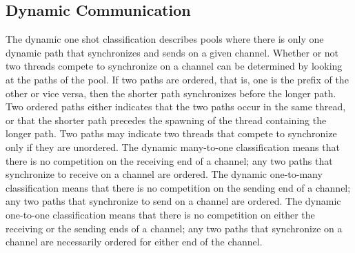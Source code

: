 \documentclass[letterpaper, 11pt]{extarticle}
\begin{document}
\subsection{Dynamic Communication}

The dynamic one shot classification describes pools where there is only one dynamic path
that synchronizes and sends on a given channel. Whether or not two threads compete to
synchronize on a channel can be determined by
looking at the paths of the pool. If two paths are ordered, that is, one is the
prefix of the other or vice versa, then the shorter path synchronizes before the longer path.
Two ordered paths either indicates that the two paths occur in the same thread, or
that the shorter path precedes the spawning of the thread containing the longer path.
Two paths may indicate two threads that compete to synchronize only if they are unordered.
The dynamic many-to-one classification means that
there is no competition on the receiving end of a channel; any two paths that synchronize to
receive on a channel are ordered. The dynamic one-to-many classification means that there
is no competition on the sending end of a channel; any two paths that synchronize to
send on a channel are ordered. The dynamic one-to-one classification means that there is no
competition on either the receiving or the sending ends of a channel; any two paths that
synchronize on a channel are necessarily ordered for either end of the channel. 
\end{document}
